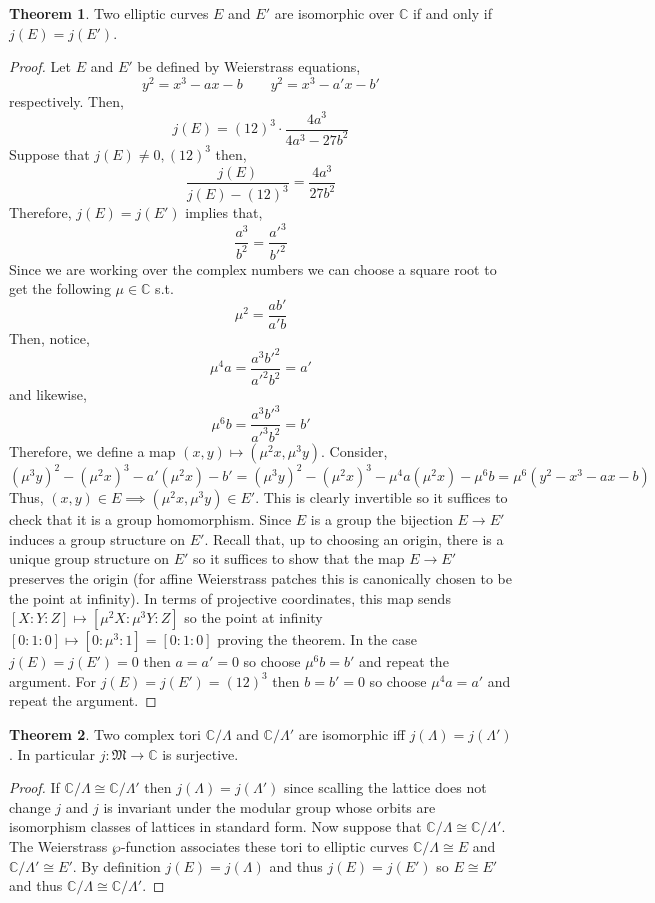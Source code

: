 \documentclass{article}
\newcommand{\C}{\mathbb{C}}
\theoremstyle{definition}
\newtheorem{theorem}{Theorem}[section]
\begin{document}
{\begin{theorem}
Two elliptic curves $E$ and $E'$ are isomorphic over  $\C$ if and only if $j(E) = j(E')$.
\end{theorem}

\begin{proof}
Let $E$ and $E'$ be defined by Weierstrass equations,
\[ y^2 = x^3 - a x - b \quad \quad y^2 = x^3 - a' x - b' \]
respectively. Then,
\[ j(E) = (12)^3 \cdot \frac{4 a^3}{4 a^3 - 27 b^2} \]
Suppose that $j(E) \neq 0, (12)^3$ then,
\[ \frac{j(E)}{j(E) - (12)^3} = \frac{4 a^3}{27 b^2} \]
Therefore, $j(E) = j(E')$ implies that,
\[ \frac{a^3}{b^2} = \frac{a'^3}{b'^2} \]
Since we are working over the complex numbers we can choose a square root to get the following $\mu \in \C$ s.t.
\[ \mu^2 = \frac{a b'}{a' b} \]
Then, notice,
\[ \mu^4 a = \frac{a^3 b'^2}{a'^2 b^2} = a' \]
and likewise,
\[ \mu^6  b = \frac{a^3 b'^3}{a'^3 b^2} = b' \]
Therefore, we define a map $(x, y) \mapsto (\mu^2 x, \mu^3 y)$. Consider,
\[ (\mu^3 y)^2 - (\mu^2 x)^3 - a' (\mu^2 x) -  b' = (\mu^3 y)^2 - (\mu^2 x)^3 - \mu^4 a (\mu^2 x) - \mu^6 b  = \mu^6 (y^2 - x^3 - a x - b) \] 
Thus, $(x, y) \in E \implies (\mu^2 x, \mu^3 y) \in E'$. This is clearly invertible so it suffices to check that it is a group homomorphism. Since $E$ is a group the bijection $E \to E'$ induces a group structure on $E'$. Recall that, up to choosing an origin, there is a unique group structure on $E'$ so it suffices to show that the map $E \to E'$ preserves the origin (for affine Weierstrass patches this is canonically chosen to be the point at infinity). In terms of projective coordinates, this map sends $[X : Y : Z] \mapsto [\mu^2 X : \mu^3 Y : Z]$ so the point at infinity $[0 : 1 : 0] \mapsto [0 : \mu^3 : 1] = [0 : 1 : 0]$ proving the theorem. In the case $j(E) = j(E') = 0$ then $a = a' = 0$ so choose $\mu^6 b = b'$ and repeat the argument. For $j(E) = j(E') = (12)^3$ then $b = b' = 0$ so choose $\mu^4 a = a'$ and repeat the argument. 
\end{proof}

\begin{theorem}
Two complex tori $\C / \Lambda$ and $\C / \Lambda'$ are isomorphic iff $j(\Lambda) = j(\Lambda')$. In particular $j : \mathfrak{M} \to \C$ is surjective.
\end{theorem}

\begin{proof}
If $\C / \Lambda \cong \C / \Lambda'$ then $j(\Lambda) = j(\Lambda')$ since scalling the lattice does not change $j$ and $j$ is invariant under the modular group whose orbits are isomorphism classes of lattices in standard form. Now suppose that $\C / \Lambda \cong \C / \Lambda'$. The Weierstrass $\wp$-function associates these tori to elliptic curves $\C / \Lambda \cong E$ and $\C / \Lambda' \cong E'$. By definition $j(E) = j(\Lambda)$ and thus $j(E) = j(E')$ so $E \cong E'$ and thus $\C / \Lambda \cong \C / \Lambda'$.  
\end{proof}

}
\end{document}
